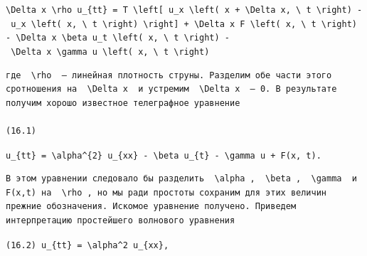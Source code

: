 \documentclass[
  ukrainian,
]{article}
\begin{document}
\texttt{\textbackslash{}Delta\ x\ \textbackslash{}rho\ u\_\{tt\}\ =\ T\ \textbackslash{}left{[}\ u\_x\ \textbackslash{}left(\ x\ +\ \textbackslash{}Delta\ x,\ \textbackslash{}\ t\ \textbackslash{}right)\ -\ u\_x\ \textbackslash{}left(\ x,\ \textbackslash{}\ t\ \textbackslash{}right)\ \textbackslash{}right{]}\ +\ \textbackslash{}Delta\ x\ F\ \textbackslash{}left(\ x,\ \textbackslash{}\ t\ \textbackslash{}right)\ -\ \textbackslash{}Delta\ x\ \textbackslash{}beta\ u\_t\ \textbackslash{}left(\ x,\ \textbackslash{}\ t\ \textbackslash{}right)\ -\ \textbackslash{}Delta\ x\ \textbackslash{}gamma\ u\ \textbackslash{}left(\ x,\ \textbackslash{}\ t\ \textbackslash{}right)}

\begin{verbatim}
где  \rho  — линейная плотность струны. Разделим обе части этого сротношения на  \Delta x  и устремим  \Delta x  — 0. В результате получим хорошо известное телеграфное уравнение

(16.1)
\end{verbatim}

\texttt{u\_\{tt\}\ =\ \textbackslash{}alpha\^{}\{2\}\ u\_\{xx\}\ -\ \textbackslash{}beta\ u\_\{t\}\ -\ \textbackslash{}gamma\ u\ +\ F(x,\ t).}

\begin{verbatim}
В этом уравнении следовало бы разделить  \alpha ,  \beta ,  \gamma  и F(x,t) на  \rho , но мы ради простоты сохраним для этих величин прежние обозначения. Искомое уравнение получено. Приведем интерпретацию простейшего волнового уравнения
\end{verbatim}

\texttt{(16.2)\ u\_\{tt\}\ =\ \textbackslash{}alpha\^{}2\ u\_\{xx\},}
\end{document}
